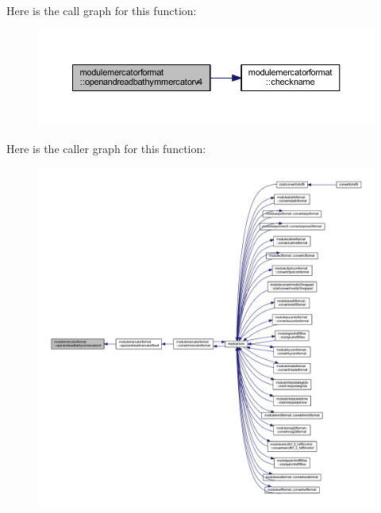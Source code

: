 Here is the call graph for this function\+:\nopagebreak
\begin{figure}[H]
\begin{center}
\leavevmode
\includegraphics[width=350pt]{namespacemodulemercatorformat_a8fac17a041e16d3f9659e7665adf2656_cgraph}
\end{center}
\end{figure}
Here is the caller graph for this function\+:\nopagebreak
\begin{figure}[H]
\begin{center}
\leavevmode
\includegraphics[width=350pt]{namespacemodulemercatorformat_a8fac17a041e16d3f9659e7665adf2656_icgraph}
\end{center}
\end{figure}
\mbox{\label{namespacemodulemercatorformat_a19c4e862a6301eb0e3e8c373ab8a15f9}} 
